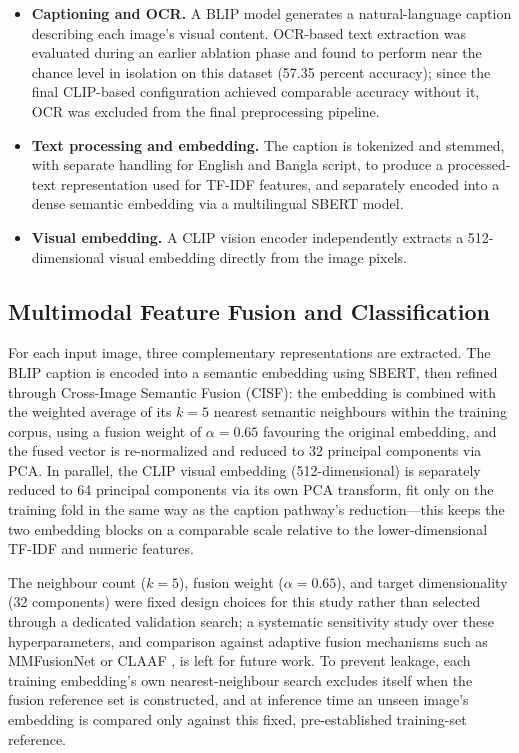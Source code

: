 \documentclass[conference,a4paper]{IEEEtran}
\begin{document}
\begin{itemize}
\item \textbf{Captioning and OCR.} A BLIP model generates a natural-language
caption describing each image's visual content. OCR-based text extraction was
evaluated during an earlier ablation phase and found to perform near the
chance level in isolation on this dataset (57.35 percent accuracy); since the
final CLIP-based configuration achieved comparable accuracy without it, OCR
was excluded from the final preprocessing pipeline.

\item \textbf{Text processing and embedding.} The caption is tokenized and
stemmed, with separate handling for English and Bangla script, to produce a
processed-text representation used for TF-IDF features, and separately encoded
into a dense semantic embedding via a multilingual SBERT model.

\item \textbf{Visual embedding.} A CLIP vision encoder independently extracts
a 512-dimensional visual embedding directly from the image pixels.
\end{itemize}

\subsection{Multimodal Feature Fusion and Classification}

For each input image, three complementary representations are extracted. The
BLIP caption is encoded into a semantic embedding using SBERT, then refined
through Cross-Image Semantic Fusion (CISF): the embedding is combined with the
weighted average of its $k=5$ nearest semantic neighbours within the training
corpus, using a fusion weight of $\alpha=0.65$ favouring the original
embedding, and the fused vector is re-normalized and reduced to 32 principal
components via PCA. In parallel, the CLIP visual embedding (512-dimensional)
is separately reduced to 64 principal components via its own PCA transform,
fit only on the training fold in the same way as the caption pathway's
reduction---this keeps the two embedding blocks on a comparable scale relative
to the lower-dimensional TF-IDF and numeric features.

The neighbour count ($k=5$), fusion weight ($\alpha=0.65$), and target
dimensionality (32 components) were fixed design choices for this study rather
than selected through a dedicated validation search; a systematic sensitivity
study over these hyperparameters, and comparison against adaptive fusion
mechanisms such as MMFusionNet \cite{mmfusionnet} or CLAAF \cite{claaf}, is
left for future work. To prevent leakage, each training embedding's own
nearest-neighbour search excludes itself when the fusion reference set is
constructed, and at inference time an unseen image's embedding is compared
only against this fixed, pre-established training-set reference.
\end{document}
